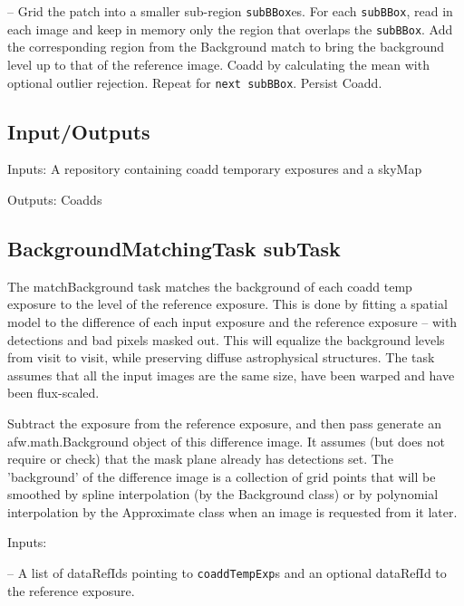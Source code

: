 \documentclass[prd, nofootinbib, floatfix, 11pt,tightenlines,times]{article}
\begin{document}
-- Grid the patch into a smaller sub-region {\tt subBBox}es. For each {\tt subBBox}, read in each image and keep in memory only the region that overlaps the {\tt subBBox}. Add the corresponding region from the Background match to bring the background level up to that of the reference image.  Coadd by calculating the mean with optional outlier rejection.  Repeat for {\tt next subBBox}.  Persist Coadd. 



\subsection{Input/Outputs}

Inputs: A repository containing coadd temporary exposures and a skyMap

Outputs: Coadds

\subsection{BackgroundMatchingTask subTask} 
The matchBackground task matches the background of each coadd temp exposure to the level of the reference exposure.   This is done by fitting a spatial model to the difference of each input exposure and the reference exposure -- with detections and bad pixels masked out.  This will equalize the background levels from visit to visit, while preserving diffuse astrophysical structures.  The task assumes that all the input images are the same size, have been warped and have been flux-scaled. 

Subtract the exposure from the reference exposure, and then pass generate an afw.math.Background object of this difference image. It assumes (but does not require or check) that the mask plane already has detections set.  The 'background' of the difference image is a collection of grid points that will be smoothed by spline interpolation (by the Background class)  or by polynomial interpolation by the Approximate class when an image is requested from it later. 

Inputs: 

-- A list of dataRefIds  pointing to {\tt coaddTempExp}s and an optional dataRefId to the reference exposure. 
\end{document}
